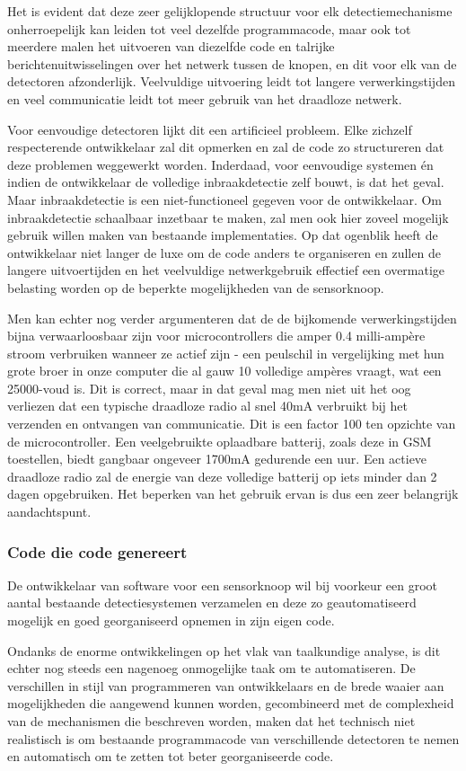 \documentclass[DIV=calc,paper=a4,fontsize=11pt,twocolumn]{scrartcl}
\newcommand{\heading}[1]{
\vspace{-5mm}
\subsubsection*{#1}
\vspace{-2mm}
}
\begin{document}
Het is evident dat deze zeer gelijklopende structuur voor elk
detectiemechanisme onherroepelijk kan leiden tot veel dezelfde programmacode,
maar ook tot meerdere malen het uitvoeren van diezelfde code en talrijke
berichtenuitwisselingen over het netwerk tussen de knopen, en dit voor elk van
de detectoren afzonderlijk. Veelvuldige uitvoering leidt tot langere
verwerkingstijden en veel communicatie leidt tot meer gebruik van het draadloze
netwerk.

Voor eenvoudige detectoren lijkt dit een artificieel probleem. Elke zichzelf
respecterende ontwikkelaar zal dit opmerken en zal de code zo structureren dat
deze problemen weggewerkt worden. Inderdaad, voor eenvoudige systemen \'en
indien de ontwikkelaar de volledige inbraakdetectie zelf bouwt, is dat het
geval. Maar inbraakdetectie is een niet-functioneel gegeven voor de
ontwikkelaar. Om inbraakdetectie schaalbaar inzetbaar te maken, zal men ook
hier zoveel mogelijk gebruik willen maken van bestaande implementaties. Op dat
ogenblik heeft de ontwikkelaar niet langer de luxe om de code anders te
organiseren en zullen de langere uitvoertijden en het veelvuldige
netwerkgebruik effectief een overmatige belasting worden op de beperkte
mogelijkheden van de sensorknoop.

Men kan echter nog verder argumenteren dat de de bijkomende verwerkingstijden
bijna verwaarloosbaar zijn voor microcontrollers die amper 0.4 milli-amp\`ere
stroom verbruiken wanneer ze actief zijn - een peulschil in vergelijking met
hun grote broer in onze computer die al gauw 10 volledige amp\`eres vraagt, wat
een 25000-voud is. Dit is correct, maar in dat geval mag men niet uit het oog
verliezen dat een typische draadloze radio al snel 40mA verbruikt bij het
verzenden en ontvangen van communicatie. Dit is een factor 100 ten opzichte van
de microcontroller. Een veelgebruikte oplaadbare batterij, zoals deze in GSM
toestellen, biedt gangbaar ongeveer 1700mA gedurende een uur. Een actieve
draadloze radio zal de energie van deze volledige batterij op iets minder dan 2
dagen opgebruiken. Het beperken van het gebruik ervan is dus een zeer
belangrijk aandachtspunt.

\heading{Code die code genereert}

De ontwikkelaar van software voor een sensorknoop wil bij voorkeur een groot
aantal bestaande detectiesystemen verzamelen en deze zo geautomatiseerd
mogelijk en goed georganiseerd opnemen in zijn eigen code.

Ondanks de enorme ontwikkelingen op het vlak van taalkundige analyse, is dit
echter nog steeds een nagenoeg onmogelijke taak om te automatiseren. De
verschillen in stijl van programmeren van ontwikkelaars en de brede waaier aan
mogelijkheden die aangewend kunnen worden, gecombineerd met de complexheid van
de mechanismen die beschreven worden, maken dat het technisch niet realistisch
is om bestaande programmacode van verschillende detectoren te nemen en
automatisch om te zetten tot beter georganiseerde code.
\end{document}
